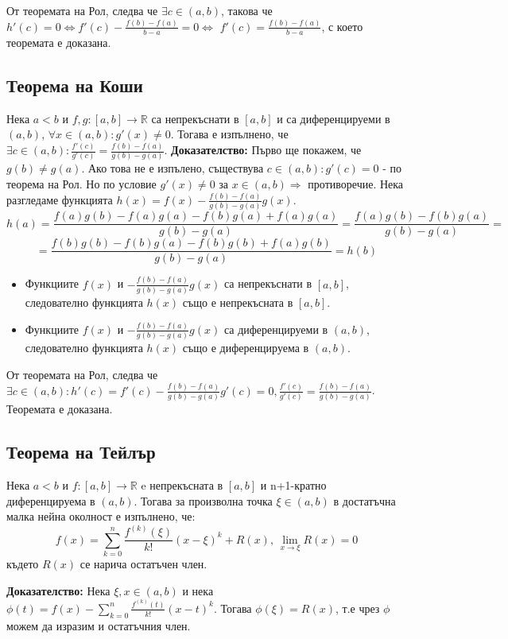 \documentclass[fleqn,12pt]{article}
\begin{document}
От теоремата на Рол, следва че $\exists c \in (a,b)$, такова че  $h'(c) = 0 \Leftrightarrow f'(c) - \frac{f(b)-f(a)}{b-a} = 0 \Leftrightarrow$
$f'(c) = \frac{f(b)-f(a)}{b-a}$, с което теоремата е доказана.

\subsection{Теорема на Коши}
Нека $a<b$ и $f,g:[a,b]\rightarrow\mathbb{R}$ са непрекъснати в $[a,b]$ и са диференцируеми в $(a,b)$, $\forall x \in (a,b): g'(x) \neq 0$.
Тогава е изпълнено, че $\exists c \in (a,b): \frac{f'(c)}{g'(c)}=\frac{f(b)-f(a)}{g(b)-g(a)}$.
\bigbreak
\textbf{Доказателство:}
Първо ще покажем, че $g(b) \neq g(a)$. Ако това не е изпълено, съществува $c \in (a,b): g'(c) = 0$ - по теорема на Рол. Но по условие $g'(x) \neq 0$ за $x \in (a,b) \Rightarrow$ противоречие.
Нека разгледаме функцията $h(x)=f(x) - \frac{f(b)-f(a)}{g(b)-g(a)}g(x)$.
\[ h(a)=\frac{f(a)g(b) - f(a)g(a) - f(b)g(a) + f(a)g(a)}{g(b)-g(a)} = \frac{f(a)g(b)-f(b)g(a)}{g(b)-g(a)} =  \]
\[ = \frac{f(b)g(b) - f(b)g(a) - f(b)g(b) + f(a)g(b)}{g(b)-g(a)} = h(b) \]
\begin{itemize}
    \item Функциите $f(x)$ и $-\frac{f(b)-f(a)}{g(b)-g(a)}g(x)$ са непрекъснати в $[a,b]$, следователно функцията $h(x)$ също е непрекъсната в $[a,b]$.
    \item Функциите $f(x)$ и $-\frac{f(b)-f(a)}{g(b)-g(a)}g(x)$ са диференцируеми в $(a,b)$, следователно функцията $h(x)$ също е диференцируема в $(a,b)$.
\end{itemize}

От теоремата на Рол, следва че $\exists c \in (a,b): h'(c) = f'(c) - \frac{f(b)-f(a)}{g(b)-g(a)}g'(c) = 0, \frac{f'(c)}{g'(c)} = \frac{f(b)-f(a)}{g(b)-g(a)}$.
Теоремата е доказана.


\subsection{Теорема на Тейлър}
Нека $a<b$ и $f:[a,b]\rightarrow\mathbb{R}$ e непрекъсната в $[a,b]$ и n+1-кратно диференцируема в $(a,b)$. 
Тогава за произволна точка $\xi \in (a,b)$ в достатъчна малка нейна околност е изпълнено, че:
\[f(x)=\sum_{k = 0}^{n} \frac{f^{(k)}(\xi)}{k!}(x-\xi)^k + R(x) \text{, } \lim_{x \rightarrow \xi} R(x) = 0\]
където $R(x)$ се нарича остатъчен член.

\textbf{Доказателство:}
Нека $\xi,x \in (a,b)$ и нека $\phi(t) = f(x) - \sum_{k = 0}^{n} \frac{f^{(k)}(t)}{k!}(x-t)^{k}$.
Тогава $\phi(\xi)=R(x)$, т.е чрез $\phi$ можем да изразим и остатъчния член.
\end{document}

